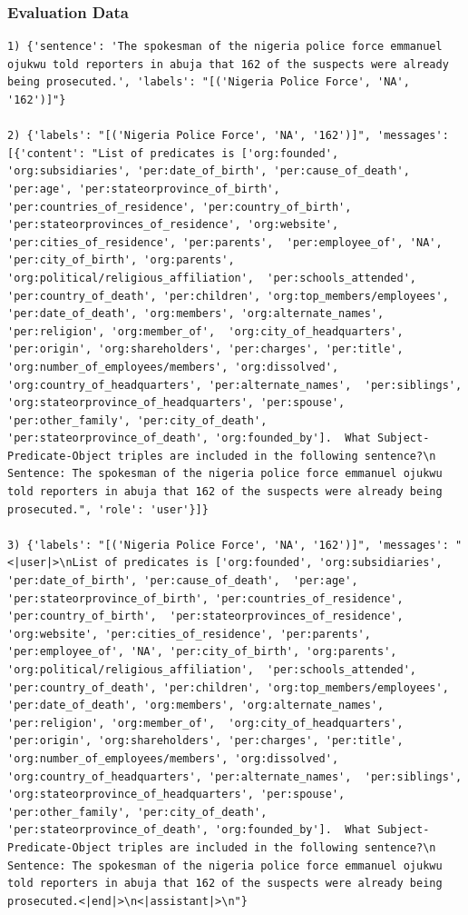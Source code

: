 \documentclass{article}
\begin{document}
\subsubsection{Evaluation Data}
\begin{lstlisting}
1) {'sentence': 'The spokesman of the nigeria police force emmanuel ojukwu told reporters in abuja that 162 of the suspects were already being prosecuted.', 'labels': "[('Nigeria Police Force', 'NA', '162')]"}

2) {'labels': "[('Nigeria Police Force', 'NA', '162')]", 'messages': [{'content': "List of predicates is ['org:founded', 'org:subsidiaries', 'per:date_of_birth', 'per:cause_of_death',  'per:age', 'per:stateorprovince_of_birth', 'per:countries_of_residence', 'per:country_of_birth',  'per:stateorprovinces_of_residence', 'org:website', 'per:cities_of_residence', 'per:parents',  'per:employee_of', 'NA', 'per:city_of_birth', 'org:parents', 'org:political/religious_affiliation',  'per:schools_attended', 'per:country_of_death', 'per:children', 'org:top_members/employees',  'per:date_of_death', 'org:members', 'org:alternate_names', 'per:religion', 'org:member_of',  'org:city_of_headquarters', 'per:origin', 'org:shareholders', 'per:charges', 'per:title',  'org:number_of_employees/members', 'org:dissolved', 'org:country_of_headquarters', 'per:alternate_names',  'per:siblings', 'org:stateorprovince_of_headquarters', 'per:spouse', 'per:other_family', 'per:city_of_death',  'per:stateorprovince_of_death', 'org:founded_by'].  What Subject-Predicate-Object triples are included in the following sentence?\n Sentence: The spokesman of the nigeria police force emmanuel ojukwu told reporters in abuja that 162 of the suspects were already being prosecuted.", 'role': 'user'}]}

3) {'labels': "[('Nigeria Police Force', 'NA', '162')]", 'messages': "<|user|>\nList of predicates is ['org:founded', 'org:subsidiaries', 'per:date_of_birth', 'per:cause_of_death',  'per:age', 'per:stateorprovince_of_birth', 'per:countries_of_residence', 'per:country_of_birth',  'per:stateorprovinces_of_residence', 'org:website', 'per:cities_of_residence', 'per:parents',  'per:employee_of', 'NA', 'per:city_of_birth', 'org:parents', 'org:political/religious_affiliation',  'per:schools_attended', 'per:country_of_death', 'per:children', 'org:top_members/employees',  'per:date_of_death', 'org:members', 'org:alternate_names', 'per:religion', 'org:member_of',  'org:city_of_headquarters', 'per:origin', 'org:shareholders', 'per:charges', 'per:title',  'org:number_of_employees/members', 'org:dissolved', 'org:country_of_headquarters', 'per:alternate_names',  'per:siblings', 'org:stateorprovince_of_headquarters', 'per:spouse', 'per:other_family', 'per:city_of_death',  'per:stateorprovince_of_death', 'org:founded_by'].  What Subject-Predicate-Object triples are included in the following sentence?\n Sentence: The spokesman of the nigeria police force emmanuel ojukwu told reporters in abuja that 162 of the suspects were already being prosecuted.<|end|>\n<|assistant|>\n"}
\end{lstlisting}


\end{document}
